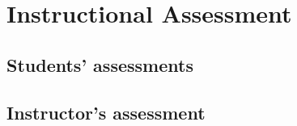 \section{Instructional Assessment}\label{sec:Assessment}
\subsection{Students' assessments}\label{sec:Student Assessment}
\lipsum[1]

\subsection{Instructor's assessment}\label{sec:Instructor Assessment}
\lipsum[1]